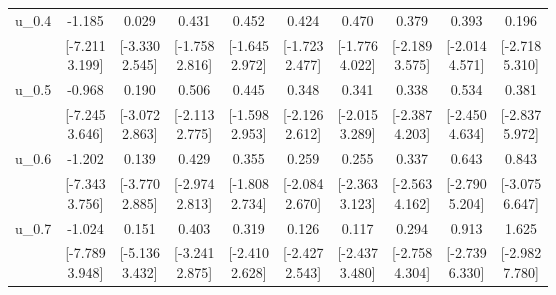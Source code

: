 {\begin{tabular}{lccccccccc}
u\_0.4 & -1.185 & 0.029 & 0.431 & 0.452 & 0.424 & 0.470 & 0.379 & 0.393 & 0.196 \\
 & \shortstack{[-7.211\\3.199]} & \shortstack{[-3.330\\2.545]} & \shortstack{[-1.758\\2.816]} & \shortstack{[-1.645\\2.972]} & \shortstack{[-1.723\\2.477]} & \shortstack{[-1.776\\4.022]} & \shortstack{[-2.189\\3.575]} & \shortstack{[-2.014\\4.571]} & \shortstack{[-2.718\\5.310]} \\[0.25em]
u\_0.5 & -0.968 & 0.190 & 0.506 & 0.445 & 0.348 & 0.341 & 0.338 & 0.534 & 0.381 \\
 & \shortstack{[-7.245\\3.646]} & \shortstack{[-3.072\\2.863]} & \shortstack{[-2.113\\2.775]} & \shortstack{[-1.598\\2.953]} & \shortstack{[-2.126\\2.612]} & \shortstack{[-2.015\\3.289]} & \shortstack{[-2.387\\4.203]} & \shortstack{[-2.450\\4.634]} & \shortstack{[-2.837\\5.972]} \\[0.25em]
u\_0.6 & -1.202 & 0.139 & 0.429 & 0.355 & 0.259 & 0.255 & 0.337 & 0.643 & 0.843 \\
 & \shortstack{[-7.343\\3.756]} & \shortstack{[-3.770\\2.885]} & \shortstack{[-2.974\\2.813]} & \shortstack{[-1.808\\2.734]} & \shortstack{[-2.084\\2.670]} & \shortstack{[-2.363\\3.123]} & \shortstack{[-2.563\\4.162]} & \shortstack{[-2.790\\5.204]} & \shortstack{[-3.075\\6.647]} \\[0.25em]
u\_0.7 & -1.024 & 0.151 & 0.403 & 0.319 & 0.126 & 0.117 & 0.294 & 0.913 & 1.625 \\
 & \shortstack{[-7.789\\3.948]} & \shortstack{[-5.136\\3.432]} & \shortstack{[-3.241\\2.875]} & \shortstack{[-2.410\\2.628]} & \shortstack{[-2.427\\2.543]} & \shortstack{[-2.437\\3.480]} & \shortstack{[-2.758\\4.304]} & \shortstack{[-2.739\\6.330]} & \shortstack{[-2.982\\7.780]} \\[0.25em]

\end{tabular}}
